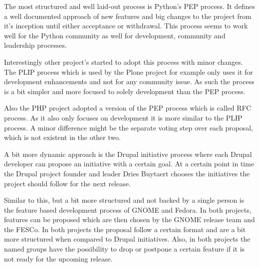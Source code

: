 The most structured and well laid-out process is Python's \ac{PEP} process. It
defines a well documented approach of new features and big changes to the
project from it's inception until either acceptance or withdrawal. This process
seems to work well for the Python community as well for development, community
and leadership processes.

Interestingly other project's started to adopt this process with minor changes.
The \ac{PLIP} process which is used by the Plone project for example only uses
it for development enhancements and not for any community issue. As such the
process is a bit simpler and more focused to solely development than the
\ac{PEP} process. 

Also the PHP project adopted a version of the \ac{PEP} process which is called
\ac{RFC} process. As it also only focuses on development it is more similar to
the \ac{PLIP} process. A minor difference might be the separate voting step
over each proposal, which is not existent in the other two.

A bit more dynamic approach is the Drupal initiative process where each Drupal
developer can propose an initiative with a certain goal. At a certain point in
time the Drupal project founder and leader Dries Buytaert chooses the
initiatives the project should follow for the next release.

Similar to this, but a bit more structured and not backed by a single person is
the feature based development process of GNOME and Fedora. In both projects,
features can be proposed which are then chosen by the GNOME release team and
the \ac{FESCo}. In both projects the proposal follow a certain format and are a
bit more structured when compared to Drupal initiatives. Also, in both projects
the named groups have the possibility to drop or postpone a certain feature if
it is not ready for the upcoming release.

